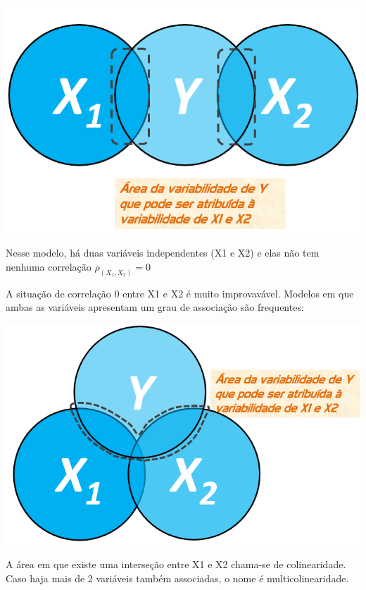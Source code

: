 \documentclass[
]{book}
\begin{document}
\includegraphics{./img/cap_reg_multipla_ortogonal.png}

Nesse modelo, há duas variáveis independentes (X1 e X2) e elas não tem nenhuma correlação \(\rho_{(X_1,X_2)}=0\)

A situação de correlação 0 entre X1 e X2 é muito improvavável. Modelos em que ambas as variáveis apresentam um grau de associação são frequentes:

\includegraphics{./img/cap_reg_multipla.png}

A área em que existe uma interseção entre X1 e X2 chama-se de colinearidade. Caso haja mais de 2 variáveis também associadas, o nome é multicolinearidade.
\end{document}
